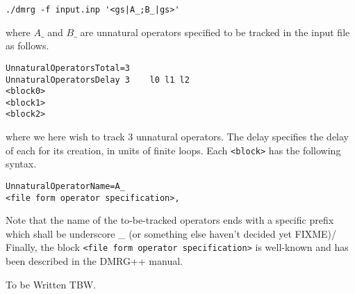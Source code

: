 \documentclass{article}
\begin{document}
\begin{verbatim}
./dmrg -f input.inp '<gs|A_;B_|gs>'
\end{verbatim}
where $A\_$ and $B\_$ are unnatural operators specified to be
tracked in the input file as follows.
\begin{verbatim}
UnnaturalOperatorsTotal=3
UnnaturalOperatorsDelay 3    l0 l1 l2
<block0>
<block1>
<block2>
\end{verbatim}
where we here wish to track 3 unnatural operators. 
The delay specifies the delay of each for its creation, in units
of finite loops.
Each \texttt{<block>} has the following syntax.
\begin{verbatim}
UnnaturalOperatorName=A_
<file form operator specification>,
\end{verbatim}
Note that the name of the to-be-tracked operators ends
 with a specific prefix which shall be underscore \_
(or something else haven't
decided yet FIXME)/
Finally, the block \texttt{<file form operator specification>} is well-known
and has been described in the DMRG++ manual.

To be Written TBW.
\end{document}
